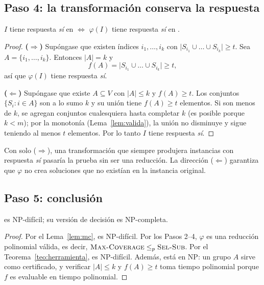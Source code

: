 \subsection{Paso 4: la transformación conserva la respuesta}

\begin{teorema}\label{teo:conserva}
$I$ tiene respuesta \emph{sí} en \MC{} $\iff$ $\varphi(I)$ tiene respuesta \emph{sí} en \SEL.
\end{teorema}
\begin{proof}
\textbf{($\Rightarrow$)} Supóngase que existen índices $i_1,\dots,i_k$ con $\big|S_{i_1}\cup\dots\cup S_{i_k}\big|\ge t$. Sea $A=\{i_1,\dots,i_k\}$. Entonces $|A|= k$ y
\[
f(A) = \big|S_{i_1}\cup\dots\cup S_{i_k}\big| \ge t,
\]
así que $\varphi(I)$ tiene respuesta \emph{sí}.

\textbf{($\Leftarrow$)} Supóngase que existe $A\subseteq V$ con $|A|\le k$ y $f(A)\ge t$. Los conjuntos $\{S_i : i\in A\}$ son a lo sumo $k$ y su unión tiene $f(A)\ge t$ elementos. Si son menos de $k$, se agregan conjuntos cualesquiera hasta completar $k$ (es posible porque $k<m$); por la monotonía (Lema~\ref{lem:valida}), la unión no disminuye y sigue teniendo al menos $t$ elementos. Por lo tanto $I$ tiene respuesta \emph{sí}.
\end{proof}

\begin{observacion}
Con solo ($\Rightarrow$), una transformación que siempre produjera instancias con respuesta \emph{sí} pasaría la prueba sin ser una reducción. La dirección ($\Leftarrow$) garantiza que $\varphi$ no crea soluciones que no existían en la instancia original.
\end{observacion}

\subsection{Paso 5: conclusión}

\begin{teorema}\label{teo:nphard}
\SEL{} es NP-difícil; su versión de decisión es NP-completa.
\end{teorema}
\begin{proof}
Por el Lema~\ref{lem:mc}, \MC{} es NP-difícil. Por los Pasos 2--4, $\varphi$ es una reducción polinomial válida, es decir, $\textsc{Max-Coverage}\le_p\textsc{Sel-Sub}$. Por el Teorema~\ref{teo:herramienta}, \SEL{} es NP-difícil. Además, \SEL{} está en NP: un grupo $A$ sirve como certificado, y verificar $|A|\le k$ y $f(A)\ge t$ toma tiempo polinomial porque $f$ es evaluable en tiempo polinomial.
\end{proof}

